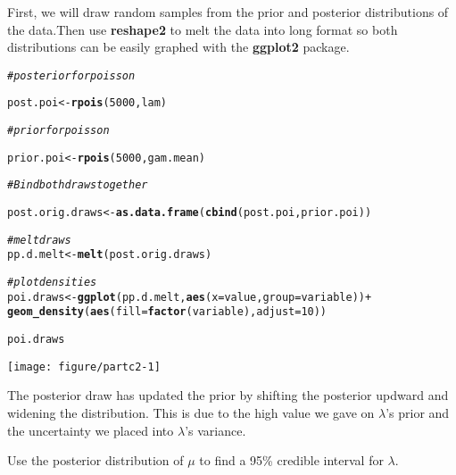 \documentclass[12pt]{article}\usepackage[]{graphicx}\usepackage[]{color}
\makeatletter
\def\maxwidth{ %
  \ifdim\Gin@nat@width>\linewidth
    \linewidth
  \else
    \Gin@nat@width
  \fi
}
\newcommand{\hlnum}[1]{\textcolor[rgb]{0.686,0.059,0.569}{#1}}%
\newcommand{\hlcom}[1]{\textcolor[rgb]{0.678,0.584,0.686}{\textit{#1}}}%
\newcommand{\hlopt}[1]{\textcolor[rgb]{0,0,0}{#1}}%
\newcommand{\hlstd}[1]{\textcolor[rgb]{0.345,0.345,0.345}{#1}}%
\newcommand{\hlkwb}[1]{\textcolor[rgb]{0.69,0.353,0.396}{#1}}%
\newcommand{\hlkwc}[1]{\textcolor[rgb]{0.333,0.667,0.333}{#1}}%
\newcommand{\hlkwd}[1]{\textcolor[rgb]{0.737,0.353,0.396}{\textbf{#1}}}%
\newenvironment{kframe}{%
 \def\at@end@of@kframe{}%
 \ifinner\ifhmode%
  \def\at@end@of@kframe{\end{minipage}}%
  \begin{minipage}{\columnwidth}%
 \fi\fi%
 \def\FrameCommand##1{\hskip\@totalleftmargin \hskip-\fboxsep
 \colorbox{shadecolor}{##1}\hskip-\fboxsep
     \hskip-\linewidth \hskip-\@totalleftmargin \hskip\columnwidth}%
 \MakeFramed {\advance\hsize-\width
   \@totalleftmargin\z@ \linewidth\hsize
   \@setminipage}}%
 {\par\unskip\endMakeFramed%
 \at@end@of@kframe}
\newenvironment{knitrout}{}{} %
\newenvironment{problem}[2][Problem]{\begin{trivlist}
\item[\hskip \labelsep {\bfseries #1}\hskip \labelsep {\bfseries #2.}]}{\end{trivlist}}
\makeatother
\begin{document}
 First, we will draw random samples from the prior and posterior distributions of the data.Then use \textbf{reshape2} to melt the data into long format so both distributions can be easily graphed  with the \textbf{ggplot2} package.
\begin{knitrout}
\color{fgcolor}\begin{kframe}
\begin{alltt}
\hlcom{#posterior for poisson}

\hlstd{post.poi} \hlkwb{<-} \hlkwd{rpois}\hlstd{(}\hlnum{5000}\hlstd{,lam)}

\hlcom{#prior for poisson}

\hlstd{prior.poi} \hlkwb{<-} \hlkwd{rpois}\hlstd{(}\hlnum{5000}\hlstd{,gam.mean)}

\hlcom{#Bind both draws together}

\hlstd{post.orig.draws} \hlkwb{<-} \hlkwd{as.data.frame}\hlstd{(}\hlkwd{cbind}\hlstd{(post.poi,prior.poi))}

\hlcom{# melt draws}
\hlstd{pp.d.melt} \hlkwb{<-} \hlkwd{melt}\hlstd{(post.orig.draws)}
\end{alltt}


{\ttfamily\noindent\itshape\color{messagecolor}{\#\# No id variables; using all as measure variables}}\begin{alltt}
\hlcom{#plot densities}
\hlstd{poi.draws} \hlkwb{<-} \hlkwd{ggplot}\hlstd{(pp.d.melt,}\hlkwd{aes}\hlstd{(}\hlkwc{x}\hlstd{=value,}\hlkwc{group}\hlstd{=variable))} \hlopt{+}
 \hlkwd{geom_density}\hlstd{(}\hlkwd{aes}\hlstd{(}\hlkwc{fill}\hlstd{=}\hlkwd{factor}\hlstd{(variable),}\hlkwc{adjust}\hlstd{=}\hlnum{10}\hlstd{))}

\hlstd{poi.draws}
\end{alltt}
\end{kframe}

{\centering \texttt{[image: figure/partc2-1]} 

}



\end{knitrout}

The posterior draw has updated the prior by shifting the posterior updward and widening the distribution. This is due to the high value we gave on $\lambda$'s prior and the uncertainty we placed into $\lambda$'s variance.

\begin{problem}{d}
Use the posterior distribution of $\mu$ to find a 95\% credible interval for $\lambda$.
\end{problem}
\end{document}
